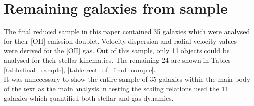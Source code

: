 \documentclass[12pt, twocolumn, nofootinbib]{revtex4-1}    %
\begin{document}
\section{Remaining galaxies from sample} \label{appendix:rest_of_final_sample}
\noindent
The final reduced sample in this paper contained 35 galaxies which were analysed for their [OII] emission doublet. Velocity dispersion and radial velocity values were derived for the [OII] gas. Out of this sample, only 11 objects could be analysed for their stellar kinematics. The remaining 24 are shown in Tables \ref{table:final_sample}, \ref{table:rest_of_final_sample}. \\

It was unnecessary to show the entire sample of 35 galaxies within the main body of the text as the main analysis in testing the scaling relations used the 11 galaxies which quantified both stellar and gas dynamics.
\end{document}
